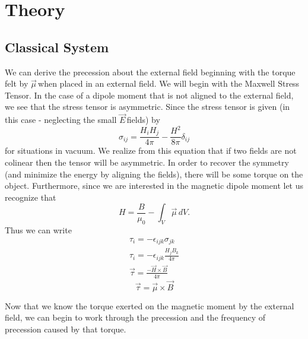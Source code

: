 \documentclass{article}
\newcommand{\dipole}{$\vec{\mu}\,$}
\newcommand{\E}{$\vec{E}\,$}
\begin{document}
\section{Theory}
	\subsection{Classical System}
	We can derive the precession about the external field beginning with the torque felt by \dipole when placed in an external field.  We will begin with the Maxwell Stress Tensor.  In the case of a dipole moment that is not aligned to the external field, we see that the stress tensor is asymmetric.  Since the stress tensor is given (in this case - neglecting the small \E fields) by
	\begin{equation*}
		\sigma_{ij} = \frac{H_iH_j}{4\pi} - \frac{H^2}{8\pi}\delta_{ij}
	\end{equation*}
	for situations in vacuum.  We realize from this equation that if two fields are not colinear then the tensor will be asymmetric.  In order to recover the symmetry (and minimize the energy by aligning the fields), there will be some torque on the object.  Furthermore, since we are interested in the magnetic dipole moment let us recognize that
	\begin{equation*}
		H = \frac{B}{\mu_0} - \int_{V}\vec{\mu}\,dV.
	\end{equation*}
	Thus we can write
	\begin{gather*}
		\tau_i = -\epsilon_{ijk}\sigma_{jk}\\
		\tau_i = -\epsilon_{ijk}\frac{H_jB_k}{4\pi}\\
		\vec{\tau} = \frac{-\vec{H} \times \vec{B}}{4\pi}
	\end{gather*}
	\begin{equation}
		\vec{\tau} = \vec{\mu} \times \vec{B}
	\end{equation}

	Now that we know the torque exerted on the magnetic moment by the external field, we can begin to work through the precession and the frequency of precession caused by that torque.
\end{document}
